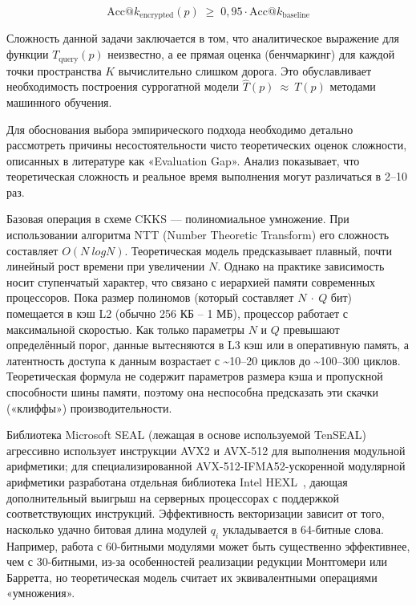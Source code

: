 \documentclass[a4paper, 12pt, oneside, openany]{article}
\begin{document}
\begin{equation}
	\mathrm{Acc}@k_{\mathrm{encrypted}}(p) \;\geq\; 0{,}95 \cdot \mathrm{Acc}@k_{\mathrm{baseline}}
	\label{eq:3-7}
\end{equation}

Сложность данной задачи заключается в том, что аналитическое выражение для функции \(T_{\mathrm{query}}(p)\) неизвестно, а ее прямая оценка (бенчмаркинг) для каждой точки пространства \(K\) вычислительно слишком дорога. Это обуславливает необходимость построения суррогатной модели \(\widehat{T}(p)\  \approx \ T(p)\) методами машинного обучения.

Для обоснования выбора эмпирического подхода необходимо детально рассмотреть причины несостоятельности чисто теоретических оценок сложности, описанных в литературе как «Evaluation Gap». Анализ показывает, что теоретическая сложность и реальное время выполнения могут различаться в 2--10 раз.

Базовая операция в схеме CKKS --- полиномиальное умножение. При использовании алгоритма NTT (Number Theoretic Transform) его сложность составляет \(O(N\ logN)\). Теоретическая модель предсказывает плавный, почти линейный рост времени при увеличении \(N\). Однако на практике зависимость носит ступенчатый характер, что связано с иерархией памяти современных процессоров. Пока размер полиномов (который составляет \(N\  \cdot \ Q\) бит) помещается в кэш L2 (обычно 256 КБ -- 1 МБ), процессор работает с максимальной скоростью. Как только параметры \(N\) и \(Q\) превышают определённый порог, данные вытесняются в L3 кэш или в оперативную память, а латентность доступа к данным возрастает с \textasciitilde10--20 циклов до \textasciitilde100--300 циклов. Теоретическая формула не содержит параметров размера кэша и пропускной способности шины памяти, поэтому она неспособна предсказать эти скачки («клиффы») производительности.

Библиотека Microsoft SEAL (лежащая в основе используемой TenSEAL) агрессивно использует инструкции AVX2 и AVX-512 для выполнения модульной арифметики; для специализированной AVX-512-IFMA52-ускоренной модулярной арифметики разработана отдельная библиотека Intel HEXL~\cite{ref74}, дающая дополнительный выигрыш на серверных процессорах с поддержкой соответствующих инструкций. Эффективность векторизации зависит от того, насколько удачно битовая длина модулей \(q_{i}\) укладывается в 64-битные слова. Например, работа с 60-битными модулями может быть существенно эффективнее, чем с 30-битными, из-за особенностей реализации редукции Монтгомери или Барретта, но теоретическая модель считает их эквивалентными операциями «умножения».
\end{document}
